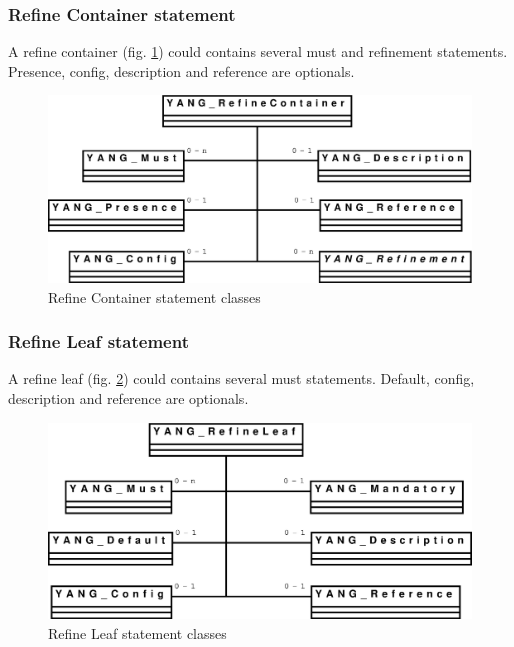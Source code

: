 \documentclass[a4paper]{article}
\begin{document}
\subsubsection{Refine Container statement}

A refine container (fig. \ref{refinecontainer}) could contains several
must  and  refinement  statements.  Presence, config,  description  and
reference are optionals.
\begin{figure}[htbp]
\begin{center}
\includegraphics[scale = .3]{refinecontainer.eps}
\end{center}
\caption{Refine Container statement classes}
\label{refinecontainer}
\end{figure}

\subsubsection{Refine Leaf statement}

A  refine leaf  (fig.  \ref{refineleaf}) could  contains several  must
statements.  Default, config, description and reference are optionals.
\begin{figure}[htbp]
\begin{center}
\includegraphics[scale = .3]{refineleaf.eps}
\end{center}
\caption{Refine Leaf statement classes}
\label{refineleaf}
\end{figure}
\end{document}
